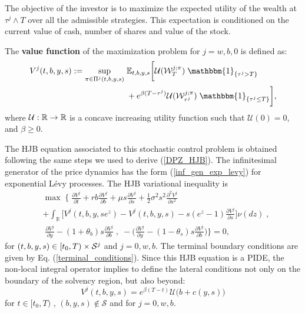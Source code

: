 The objective of the investor is to maximize the expected utility of the wealth at $\tau^j \wedge T$ over all the admissible
strategies. This expectation is conditioned on the current value of cash, number of shares and value of the
stock.
\begin{Definition}
 The \textbf{value function} of the maximization problem for $j=w,b,0$ is defined as:
\begin{align}\label{max_probl1}
V^j(t,b,y,s) := \sup_{\pi \in \Pi^j(t,b,y,s)} \; & \E_{t,b,y,s}\biggl[ 
            \mathcal{U}(\mathcal{W}^{j; \pi}_T) \; \mathbbm{1}_{\{\tau^j > T\}} \\ \nonumber
             &+ e^{ \beta (T-\tau^j)} \mathcal{U}( \mathcal{W}^{j; \pi}_{\tau^j} ) \; 
             \mathbbm{1}_{\{\tau^j \leq T\}}\biggr],             
\end{align}
where $\mathcal{U}: \mathbb{R} \to \mathbb{R}$ is a concave increasing utility function such that $\mathcal{U}(0)=0$, and $\beta \geq 0$.
\end{Definition}

The HJB equation associated to this stochastic control problem is obtained following the same steps we used to derive (\ref{DPZ_HJB}). The infinitesimal generator of the price 
dynamics has the 
form (\ref{inf_gen_exp_levy}) for exponential Lévy processes. The HJB variational inequality is
\begin{align}\label{HJB1}
& \max \; \biggl\{ \; \frac{\partial V^j}{\partial t} + rb\frac{\partial V^j}{\partial b} 
+ \mu s \frac{\partial V^j}{\partial s} + \frac{1}{2}\sigma^2 s^2 \frac{\partial^2 V^j}{\partial s^2} \\ \nonumber
&+ \int_\mathbb{R}
\biggl[ V^j(t,b,y,se^z) - V^j(t,b,y,s) - s(e^z-1)\frac{\partial V^j}{\partial s} \biggr] \nu(dz) \;,\\ \nonumber
& \;  \frac{\partial V^j}{\partial y}-(1+\theta_b) s \frac{\partial V^j}{\partial b} \; 
, \; -\biggl(\frac{\partial V^j}{\partial y}-(1-\theta_s)s \frac{\partial V^j}{\partial b} \biggr) \biggr\} = 0, 
 \end{align}
for $(t,b,y,s) \in [t_0,T) \times \mathcal{S}^j$ and $j=0,w,b$.   
The terminal boundary conditions are given by Eq. (\ref{terminal_conditions}).
Since this HJB equation is a PIDE,
the non-local integral operator implies to 
define the lateral conditions not only on the boundary
of the solvency region, but also beyond:
\begin{equation}\label{lat_bound}
V^j(t,b,y,s) = e^{ \beta (T-t)} \mathcal{U}\bigl( b + c(y,s)\bigr) 
\end{equation}
for $t \in [t_0,T)$ , $(b,y,s) \not \in \mathcal{S}$ and for $j=0,w,b$. 


